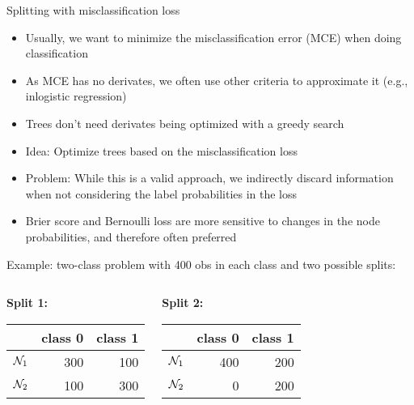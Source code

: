 \documentclass[11pt,compress,t,notes=noshow, xcolor=table]{beamer}
\begin{document}
\begin{vbframe}{Splitting with misclassification loss}

\begin{itemize}
\item Usually, we want to minimize the misclassification error (MCE) when doing classification
\item As MCE has no derivates, we often use other criteria to approximate it (e.g., inlogistic regression)
\item Trees don't need derivates being optimized with a greedy search
\item Idea: Optimize trees based on the misclassification loss
\item Problem: While this is a valid approach, we indirectly discard information when not considering the label probabilities in the loss
\item Brier score and Bernoulli loss are more sensitive to changes in the node probabilities, and therefore often preferred


\end{itemize}

\framebreak

Example: two-class problem with 400 obs in each class and two possible splits:
\begin{small}
\begin{columns}[T,onlytextwidth]
\begin{center}
\textbf{Split 1:} \\
\vspace{0.25cm}
\begin{table}[ht]
\centering
\begin{tabular}{rrr}
  \hline
 & class 0 & class 1 \\ 
  \hline
$\mathcal{N}_1$ & 300 & 100 \\ 
  $\mathcal{N}_2$ & 100 & 300 \\ 
   \hline
\end{tabular}
\end{table}

\end{center}
\begin{center}
\textbf{Split 2:} \\
\vspace{0.25cm}
\begin{table}[ht]
\centering
\begin{tabular}{rrr}
  \hline
 & class 0 & class 1 \\ 
  \hline
$\mathcal{N}_1$ & 400 & 200 \\ 
  $\mathcal{N}_2$ &   0 & 200 \\ 
   \hline
\end{tabular}
\end{table}


\end{center}
\end{columns}
\end{small}
\end{vbframe}
\end{document}
